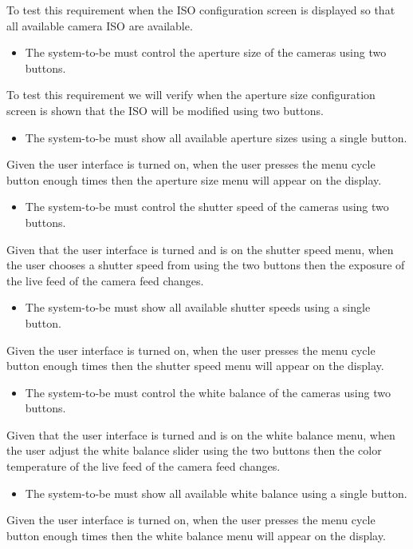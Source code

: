 To test this requirement when the ISO configuration screen is displayed so that all available camera ISO are available.
\begin{itemize}
    \item The system-to-be must control the aperture size of the cameras using two buttons.
\end{itemize}
To test this requirement we will verify when the aperture size configuration screen is shown that the ISO will be modified using two buttons.
\begin{itemize}
    \item The system-to-be must show all available aperture sizes using a single button.
\end{itemize}
Given the user interface is turned on, when the user presses the menu cycle button enough times then the aperture size menu will appear on the display.
\begin{itemize}
    \item The system-to-be must control the shutter speed of the cameras using two buttons.
\end{itemize}
Given that the user interface is turned and is on the shutter speed menu, when the user chooses a shutter speed from using the two buttons then the exposure of the live feed of the camera feed changes.
\begin{itemize}
    \item The system-to-be must show all available shutter speeds using a single button.
\end{itemize}
Given the user interface is turned on, when the user presses the menu cycle button enough times then the shutter speed menu will appear on the display.
\begin{itemize}
    \item The system-to-be must control the white balance of the cameras using two buttons.
\end{itemize}
Given that the user interface is turned and is on the white balance menu, when the user adjust the white balance slider using the two buttons then the color temperature of the live feed of the camera feed changes.
\begin{itemize}
    \item The system-to-be must show all available white balance using a single button.
\end{itemize}
Given the user interface is turned on, when the user presses the menu cycle button enough times then the white balance menu will appear on the display.